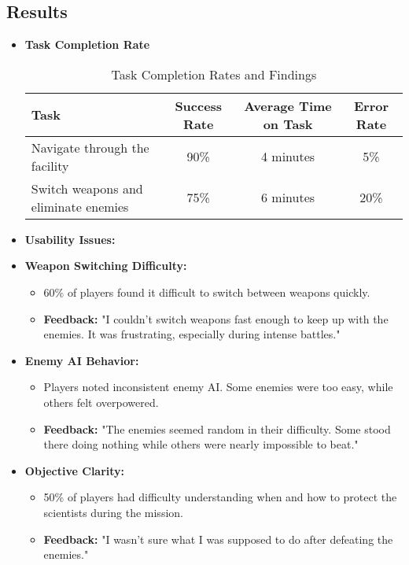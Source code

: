 	\subsection{Results}
	\begin{itemize}
		\item \textbf{Task Completion Rate}
		\begin{table}[h]
			\centering
			\caption{Task Completion Rates and Findings}
			\begin{tabular}{|l|c|c|c|}
				\hline
				\textbf{Task} & \textbf{Success Rate} & \textbf{Average Time on Task} & \textbf{Error Rate} \\ \hline
				Navigate through the facility & 90\% & 4 minutes & 5\% \\ \hline
				Switch weapons and eliminate enemies & 75\% & 6 minutes & 20\% \\ \hline
			\end{tabular}
		\end{table}
	\item \textbf{Usability Issues:}
		\item \textbf{Weapon Switching Difficulty:}
	\begin{itemize}
		\item {60\% of players found it difficult to switch between weapons quickly.}
		\item {\textbf{Feedback:} "I couldn't switch weapons fast enough to keep up with the enemies. It was frustrating, especially during intense battles."}
	\end{itemize}
	\item \textbf{Enemy AI Behavior:}
	\begin{itemize}
		\item {Players noted inconsistent enemy AI. Some enemies were too easy, while others felt overpowered.}
		\item {\textbf{Feedback:} "The enemies seemed random in their difficulty. Some stood there doing nothing while others were nearly impossible to beat."}
	\end{itemize}
	\item \textbf{Objective Clarity:}
	\begin{itemize}
		\item {50\% of players had difficulty understanding when and how to protect the scientists during the mission.}
		\item{ \textbf{Feedback:} "I wasn't sure what I was supposed to do after defeating the enemies."}
	\end{itemize}
	\end{itemize}

